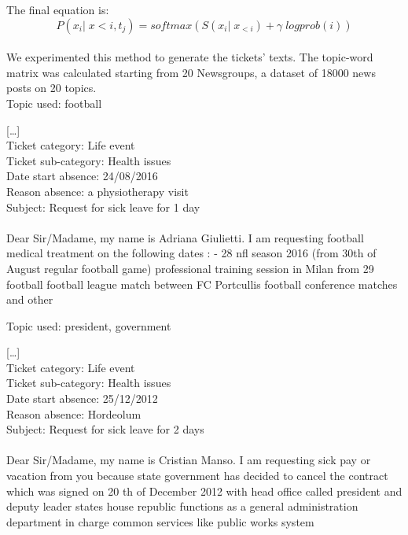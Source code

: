 The final equation is:
\begin{equation*}
    P(x_i|\;x{<i},t_j) = softmax(S(x_i|\;x_{<i}) + \gamma\;logprob(i))
\end{equation*}
\\
We experimented this method to generate the tickets' texts. The topic-word matrix was calculated starting from 20 Newsgroups, a dataset of 18000 news posts on 20 topics. \\

Topic used: football
\begin{adjustwidth}{1cm}{}
    [\dots] \\
    Ticket category: Life event\\
    Ticket sub-category: Health issues\\
    Date start absence: 24/08/2016\\
    Reason absence: a physiotherapy visit\\
    Subject: Request for sick leave for 1 day\\\\
    Dear Sir/Madame, my name is Adriana Giulietti. I am requesting football medical treatment on the following dates : - 28 nfl season 2016 (from 30th of August regular football game) professional training session in Milan from 29 football football league match between FC Portcullis football conference matches and other 
\end{adjustwidth}

Topic used: president, government
\begin{adjustwidth}{1cm}{}
    [\dots] \\
    Ticket category: Life event\\
    Ticket sub-category: Health issues\\
    Date start absence: 25/12/2012\\
    Reason absence: Hordeolum\\
    Subject: Request for sick leave for 2 days\\\\
    Dear Sir/Madame, my name is Cristian Manso. I am requesting sick pay or vacation from you because state government has decided to cancel the contract which was signed on 20 th of 
    December 2012 with head office called president and deputy leader states house republic functions as a general administration department in charge common services like public works system
    \end{adjustwidth}

    

